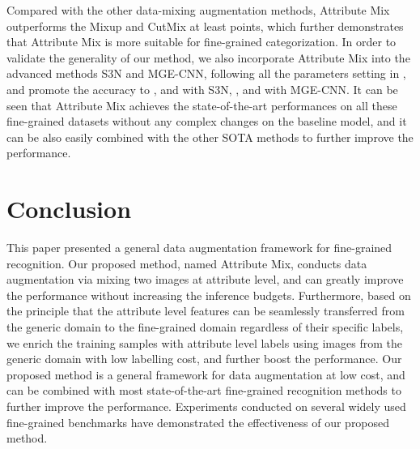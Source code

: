 \documentclass[runningheads]{llncs}
\begin{document}
Compared with the other data-mixing augmentation methods, Attribute Mix outperforms the Mixup and CutMix at least  points, which further demonstrates that Attribute Mix is more suitable for fine-grained categorization.  In order  to validate  the  generality  of  our  method,  we  also  incorporate Attribute Mix into the advanced methods S3N and MGE-CNN, following all the parameters setting in \cite{ding2019selective}\cite{zhang2019learning}, and promote the accuracy to ,  and  with S3N, ,  and  with MGE-CNN.  It can be seen that Attribute Mix achieves the state-of-the-art performances on all these fine-grained datasets without any complex changes on the baseline model, and it can be also easily combined with the other SOTA methods to further improve the performance. 



\section{Conclusion}
\noindent This paper presented a general data augmentation framework for fine-grained recognition. Our proposed method, named Attribute Mix, conducts data augmentation via mixing two images at attribute level, and can greatly improve the performance without increasing the inference budgets. Furthermore, based on the principle that the attribute level features can be seamlessly transferred from the generic domain to the fine-grained domain regardless of their specific labels, we enrich the training samples with attribute level labels using images from the generic domain with low labelling cost, and further boost the performance. Our proposed method is a general framework for data augmentation at low cost, and can be combined with most state-of-the-art fine-grained recognition methods to further improve the performance. Experiments conducted on several widely used fine-grained benchmarks have demonstrated the effectiveness of our proposed method.




\end{document}
